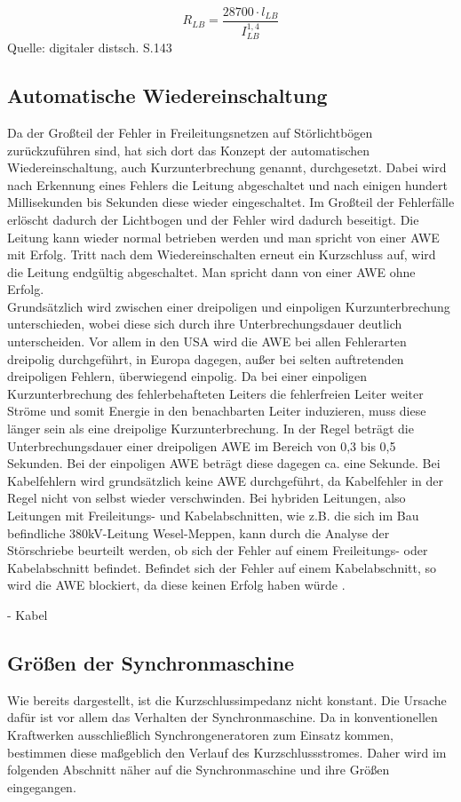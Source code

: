 \documentclass{scrartcl}
\begin{document}
\begin{onehalfspace}
\begin{equation}
R_{LB} = \frac{28700 \cdot l_{LB}}{I_{LB}^{1,4}}
\end{equation}
Quelle: digitaler distsch. S.143

\subsection{Automatische Wiedereinschaltung}
Da der Großteil der Fehler in Freileitungsnetzen auf Störlichtbögen zurückzuführen sind, hat sich dort das Konzept der automatischen Wiedereinschaltung, auch Kurzunterbrechung genannt, durchgesetzt. Dabei wird nach Erkennung eines Fehlers die Leitung abgeschaltet und nach einigen hundert Millisekunden bis Sekunden diese wieder eingeschaltet. Im Großteil der Fehlerfälle erlöscht dadurch der Lichtbogen und der Fehler wird dadurch beseitigt. Die Leitung kann wieder normal betrieben werden und man spricht von einer \glqq AWE mit Erfolg\grqq. Tritt nach dem Wiedereinschalten erneut ein Kurzschluss auf, wird die Leitung endgültig abgeschaltet. Man spricht dann von einer \glqq AWE ohne Erfolg\grqq. \\
Grundsätzlich wird zwischen einer dreipoligen und einpoligen Kurzunterbrechung unterschieden, wobei diese sich durch ihre Unterbrechungsdauer deutlich unterscheiden. Vor allem in den USA wird die AWE bei allen Fehlerarten dreipolig durchgeführt, in Europa dagegen, außer bei selten auftretenden dreipoligen Fehlern, überwiegend einpolig. Da bei einer einpoligen Kurzunterbrechung des fehlerbehafteten Leiters die fehlerfreien Leiter weiter Ströme und somit Energie in den benachbarten Leiter induzieren, muss diese länger sein als eine dreipolige Kurzunterbrechung. In der Regel beträgt die Unterbrechungsdauer einer dreipoligen AWE im Bereich von 0,3 bis 0,5 Sekunden. Bei der einpoligen AWE beträgt diese dagegen ca. eine Sekunde\cite[S. 66]{Ziegler2008}. Bei Kabelfehlern wird grundsätzlich keine AWE durchgeführt, da Kabelfehler in der Regel nicht von selbst wieder verschwinden. Bei hybriden Leitungen, also Leitungen mit Freileitungs- und Kabelabschnitten, wie z.B. die sich im Bau befindliche 380kV-Leitung Wesel-Meppen, kann durch die Analyse der Störschriebe beurteilt werden, ob sich der Fehler auf einem Freileitungs- oder Kabelabschnitt befindet. Befindet sich der Fehler auf einem Kabelabschnitt, so wird die AWE blockiert, da diese keinen Erfolg haben würde \cite{hybrid-ltg}.


- Kabel

\subsection{Größen der Synchronmaschine}
Wie bereits dargestellt, ist die Kurzschlussimpedanz nicht konstant. Die Ursache dafür ist vor allem das Verhalten der Synchronmaschine. Da in konventionellen Kraftwerken ausschließlich Synchrongeneratoren zum Einsatz kommen, bestimmen diese maßgeblich den Verlauf des Kurzschlussstromes. Daher wird im folgenden Abschnitt näher auf die Synchronmaschine und ihre Größen eingegangen.


\end{onehalfspace}
\end{document}
